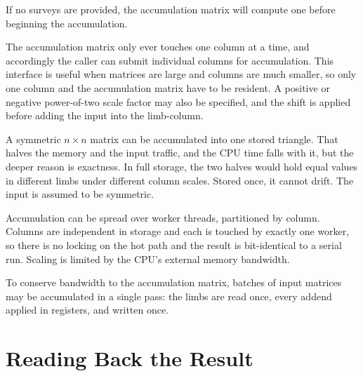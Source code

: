 \documentclass[acmsmall,screen,review]{acmart}
\begin{document}
If no surveys are provided, the accumulation matrix will compute one before beginning the accumulation.

The accumulation matrix only ever touches one column at a time, and accordingly the caller can submit individual columns for accumulation. This interface is useful when matrices are large and columns are much smaller, so only one column and the accumulation matrix have to be resident. A positive or negative power-of-two scale factor may also be specified, and the shift is applied before adding the input into the limb-column.

A symmetric $n \times n$ matrix can be accumulated into one stored triangle. That halves the memory and the input traffic, and the CPU time falls with it, but the deeper reason is exactness. In full storage, the two halves would hold equal values in different limbs under different column scales. Stored once, it cannot drift. The input is assumed to be symmetric.

Accumulation can be spread over worker threads, partitioned by column. Columns are independent in storage and each is touched by exactly one worker, so there is no locking on the hot path and the result is bit-identical to a serial run. Scaling is limited by the CPU's external memory bandwidth.

To conserve bandwidth to the accumulation matrix, batches of input matrices may be accumulated in a single pass: the limbs are read once, every addend applied in registers, and written once.

\section{Reading Back the Result}
\end{document}
